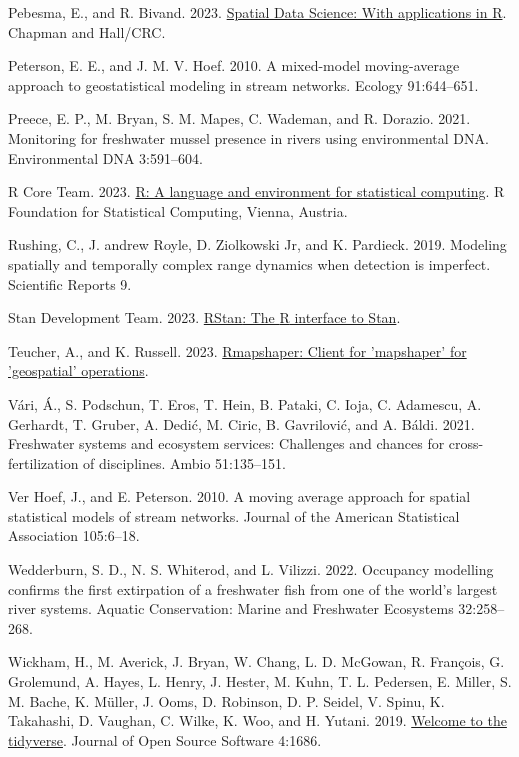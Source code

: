 \documentclass[
  11pt,
  a4paper,
]{article}
\newlength{\cslhangindent}
\newenvironment{CSLReferences}[2] %
 {\begin{list}{}{%
  \setlength{\itemindent}{0pt}
  \setlength{\leftmargin}{0pt}
  \setlength{\parsep}{0pt}
  \ifodd #1
   \setlength{\leftmargin}{\cslhangindent}
   \setlength{\itemindent}{-1\cslhangindent}
  \fi
  \setlength{\itemsep}{#2\baselineskip}}}
 {\end{list}}
\begin{document}
\begin{CSLReferences}{1}{0}
Pebesma, E., and R. Bivand. 2023. \href{https://doi.org/10.1201/9780429459016}{{Spatial Data Science: With applications in R}}. {Chapman and Hall/CRC}.

Peterson, E. E., and J. M. V. Hoef. 2010. A mixed-model moving-average approach to geostatistical modeling in stream networks. Ecology 91:644--651.

Preece, E. P., M. Bryan, S. M. Mapes, C. Wademan, and R. Dorazio. 2021. Monitoring for freshwater mussel presence in rivers using environmental DNA. Environmental DNA 3:591--604.

R Core Team. 2023. \href{https://www.R-project.org/}{R: A language and environment for statistical computing}. R Foundation for Statistical Computing, Vienna, Austria.

Rushing, C., J. andrew Royle, D. Ziolkowski Jr, and K. Pardieck. 2019. Modeling spatially and temporally complex range dynamics when detection is imperfect. Scientific Reports 9.

Stan Development Team. 2023. \href{https://mc-stan.org/}{{RStan}: The {R} interface to {Stan}}.

Teucher, A., and K. Russell. 2023. \href{https://CRAN.R-project.org/package=rmapshaper}{Rmapshaper: Client for 'mapshaper' for 'geospatial' operations}.

Vári, Á., S. Podschun, T. Eros, T. Hein, B. Pataki, C. Ioja, C. Adamescu, A. Gerhardt, T. Gruber, A. Dedić, M. Ciric, B. Gavrilović, and A. Báldi. 2021. Freshwater systems and ecosystem services: Challenges and chances for cross-fertilization of disciplines. Ambio 51:135--151.

Ver Hoef, J., and E. Peterson. 2010. A moving average approach for spatial statistical models of stream networks. Journal of the American Statistical Association 105:6--18.

Wedderburn, S. D., N. S. Whiterod, and L. Vilizzi. 2022. Occupancy modelling confirms the first extirpation of a freshwater fish from one of the world's largest river systems. Aquatic Conservation: Marine and Freshwater Ecosystems 32:258--268.

Wickham, H., M. Averick, J. Bryan, W. Chang, L. D. McGowan, R. François, G. Grolemund, A. Hayes, L. Henry, J. Hester, M. Kuhn, T. L. Pedersen, E. Miller, S. M. Bache, K. Müller, J. Ooms, D. Robinson, D. P. Seidel, V. Spinu, K. Takahashi, D. Vaughan, C. Wilke, K. Woo, and H. Yutani. 2019. \href{https://doi.org/10.21105/joss.01686}{Welcome to the {tidyverse}}. Journal of Open Source Software 4:1686.

\end{CSLReferences}
\end{document}
